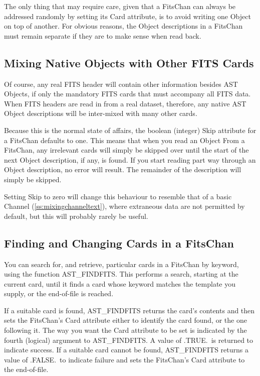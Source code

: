 \documentclass[twoside,11pt]{article}
\newcommand{\htmlref}[2]{#1}
\newcommand{\secref}[1]{\S\ref{#1}}
\renewcommand{\secref}[1]{\ref{#1}}
\begin{document}
The only thing that may require care, given that a FitsChan can always
be addressed randomly by setting its Card attribute, is to avoid
writing one Object on top of another. For obvious reasons, the Object
descriptions in a FitsChan must remain separate if they are to make
sense when read back.

\subsection{Mixing Native Objects with Other FITS Cards}

Of course, any real FITS header will contain other information besides
AST Objects, if only the mandatory FITS cards that must accompany all
FITS data. When FITS headers are read in from a real dataset,
therefore, any native AST \htmlref{Object}{Object} descriptions will be inter-mixed with
many other cards.

Because this is the normal state of affairs, the boolean (integer)
\htmlref{Skip}{Skip} attribute for a \htmlref{FitsChan}{FitsChan} defaults to one. This means that when
you read an Object From a FitsChan, any irrelevant cards will simply
be skipped over until the start of the next Object description, if
any, is found. If you start reading part way through an Object
description, no error will result. The remainder of the description
will simply be skipped.

Setting Skip to zero will change this behaviour to resemble that of a
basic \htmlref{Channel}{Channel} (\secref{ss:mixingchanneltext}), where extraneous data
are not permitted by default, but this will probably rarely be useful.

\subsection{\label{ss:findingandchangingfits}Finding and Changing Cards in a FitsChan}

You can search for, and retrieve, particular cards in a \htmlref{FitsChan}{FitsChan} by
keyword, using the function \htmlref{AST\_FINDFITS}{AST_FINDFITS}. This performs a search,
starting at the current card, until it finds a card whose keyword
matches the template you supply, or the end-of-file is reached.

If a suitable card is found, AST\_FINDFITS returns the card's contents
and then sets the FitsChan's \htmlref{Card}{Card} attribute either to identify the
card found, or the one following it. The way you want the Card
attribute to be set is indicated by the fourth (logical) argument to
AST\_FINDFITS. A value of .TRUE.\ is returned to indicate success.  If
a suitable card cannot be found, AST\_FINDFITS returns a value of
.FALSE.\ to indicate failure and sets the FitsChan's Card attribute to
the end-of-file.
\end{document}
